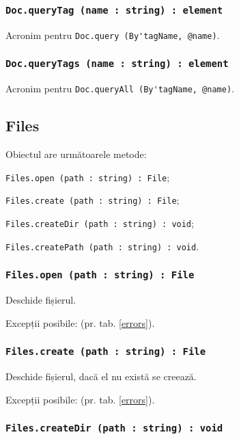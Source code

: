 \subsubsection{\lstinline|Doc.queryTag (name : string) : element|}

Acronim pentru \lstinline|Doc.query (By'tagName, @name)|.

\subsubsection{\lstinline|Doc.queryTags (name : string) : element|}

Acronim pentru \lstinline|Doc.queryAll (By'tagName, @name)|.

\subsection{{\color{orange} Files}}

Obiectul \files{} are următoarele metode:
\begin{icItems}
	\item \lstinline|Files.open (path : string) : File|;
	\item \lstinline|Files.create (path : string) : File|;
	\item \lstinline|Files.createDir (path : string) : void|;
	\item \lstinline|Files.createPath (path : string) : void|.
\end{icItems}

\subsubsection{\lstinline|Files.open (path : string) : File|}

Deschide fișierul.

Excepții posibile:  (pr. tab. \ref{errors}).

\subsubsection{\lstinline|Files.create (path : string) : File|}

Deschide fișierul, dacă el nu există se creează.

Excepții posibile:  (pr. tab. \ref{errors}).

\subsubsection{\lstinline|Files.createDir (path : string) : void|}

